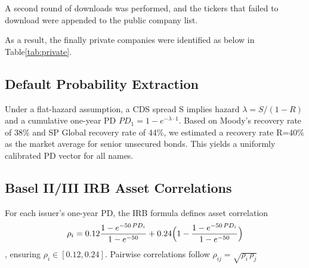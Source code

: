 \documentclass[
	a4paper,         %
	12pt,            %
	unnumberedsections,  %
	twoside,         %
]{LTJournalArticle}
\begin{document}
A second round of downloads was performed, and the tickers that failed to download were appended to the public company list. 

As a result, the finally private companies were identified as below in Table\ref{tab:private}.

\begin{table}[h!]
\centering
{}
\caption{CDS Spreads for Selected Companies}
\label{tab:private}
\end{table}

\subsection{Default Probability Extraction}Under a flat-hazard assumption, a CDS spread S implies hazard $\lambda = S/(1-R)$ and a cumulative one-year PD
$PD_1 = 1 - e^{-\lambda\cdot1}$\cite{hull_derivatives_2022}. Based on Moody's recovery rate of 38\%\cite{moodys_ultimate_recovery_database} and SP Global\cite{spglobal_loan_recoveries_2023} recovery rate of 44\%, we estimated a recovery rate R=40\% as the market average for senior unsecured bonds. This yields a uniformly calibrated PD vector for all names.

\subsection{Basel II/III IRB Asset Correlations}
For each issuer’s one-year PD, the IRB formula defines asset correlation
$$\rho_i=0.12\frac{1 - e^{-50\,PD_i}}{1 - e^{-50}}
+0.24\Bigl(1 - \frac{1 - e^{-50\,PD_i}}{1 - e^{-50}}\Bigr)$$,
ensuring $\rho_i\in[0.12,0.24]$. Pairwise correlations follow $\rho_{ij}=\sqrt{\rho_i\,\rho_j}$
\end{document}
